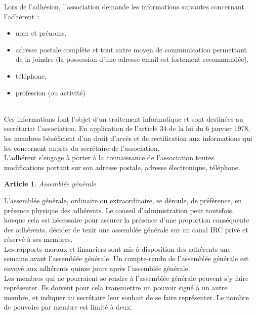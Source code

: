 \documentclass[a4paper,twoside]{article}
\theoremstyle{plain}
\newtheorem{Art}{Article}
\begin{document}
Lors de l'adhésion, l'association  demande les informations suivantes concernant
l'adhérent~:

\begin{itemize}
\item nom et prénoms,
\item adresse postale complète et tout autre moyen de communication permettant
      de la joindre (la possession d'une adresse email est fortement
      recommandée),
\item téléphone,
\item profession (ou activité)
\end{itemize}
~\\ 

Ces informations font l'objet d'un  traitement informatique et sont destinées au
secrétariat l'association. En application de l'article 34 de la loi du 6 janvier
1978,  les  membres bénéficient  d'un  droit  d'accès  et de  rectification  aux
informations qui les concernent auprès du secrétaire de l'association.\\

L'adhérent  s'engage  à  porter   à  la  connaissance  de  l'association  toutes
modifications   portant   sur  son   adresse   postale,  adresse   électronique,
téléphone.

\begin{Art}Assemblée générale\end{Art}

L'assemblée générale, ordinaire ou extraordinaire, se déroule, de préfèrence, en
présence  physique des  adhérents. Le  conseil d'administration  peut toutefois,
lorsque  cela   est  nécessaire  pour  assurer  la   présence  d'une  proportion
conséquente des adhérents, décider de  tenir une assemblée générale sur un canal
IRC privé et réservé à ses membres.\\

Les  rapports moraux  et financiers  sont mis  à disposition  des  adhérents une
semaine avant l'assemblée générale.  Un compte-rendu de l'assemblée générale est
envoyé aux adhérents quinze jours après l'assemblée générale.\\

Les membres qui ne pourraient se rendre à l'assemblée générale peuvent s'y faire
représenter.  Ils doivent  pour cela  transmettre un  pouvoir signé  à  un autre
membre,  et indiquer  au secrétaire  leur souhait  de se  faire  représenter. Le
nombre de pouvoirs par membre est limité à deux.\\
\end{document}
